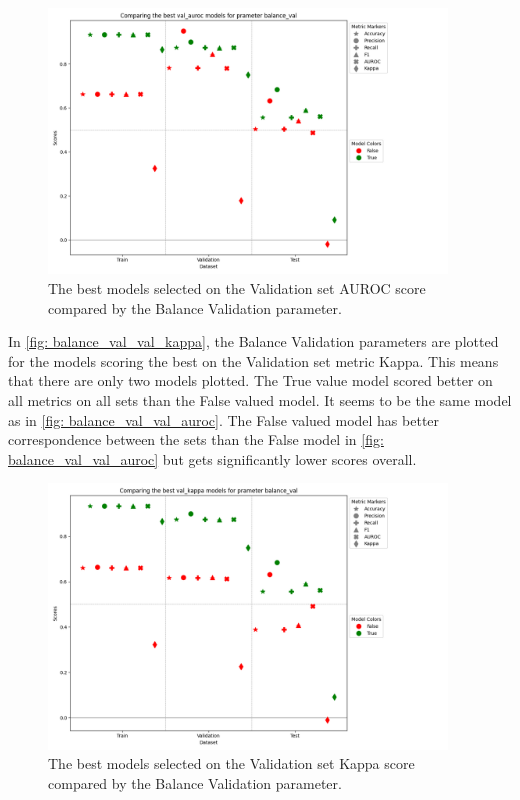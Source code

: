\begin{figure}[H]
    \centering
    \includegraphics[width=400px]{Figures/results/balance_val/balance_val_val_auroc.png}
    \caption{The best models selected on the Validation set AUROC score compared by the Balance Validation parameter.}
    \label{fig: balance_val_val_auroc}
\end{figure}

In \autoref{fig: balance_val_val_kappa}, the Balance Validation parameters are plotted for the models scoring the best on the Validation set metric Kappa. This means that there are only two models plotted. The True value model scored better on all metrics on all sets than the False valued model. It seems to be the same model as in \autoref{fig: balance_val_val_auroc}. The False valued model has better correspondence between the sets than the False model in \autoref{fig: balance_val_val_auroc} but gets significantly lower scores overall. 


\begin{figure}[H]
    \centering
    \includegraphics[width=400px]{Figures/results/balance_val/balance_val_val_kappa.png}
    \caption{The best models selected on the Validation set Kappa score compared by the Balance Validation parameter.}
    \label{fig: balance_val_val_kappa}
\end{figure}

